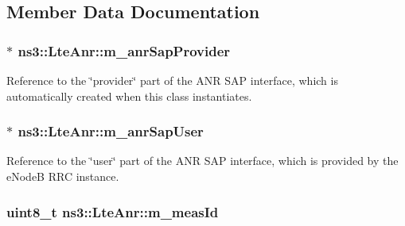 \subsection{Member Data Documentation}
\subsubsection[{\texorpdfstring{m\+\_\+anr\+Sap\+Provider}{m_anrSapProvider}}]{$\ast$ ns3\+::\+Lte\+Anr\+::m\+\_\+anr\+Sap\+Provider\hspace{0.3cm}{\ttfamily [private]}}\hypertarget{classns3_1_1LteAnr_a5355c7d93e18c6297707280bcabebe15}{}\label{classns3_1_1LteAnr_a5355c7d93e18c6297707280bcabebe15}


Reference to the \char`\"{}provider\char`\"{} part of the A\+NR S\+AP interface, which is automatically created when this class instantiates. 

\subsubsection[{\texorpdfstring{m\+\_\+anr\+Sap\+User}{m_anrSapUser}}]{$\ast$ ns3\+::\+Lte\+Anr\+::m\+\_\+anr\+Sap\+User\hspace{0.3cm}{\ttfamily [private]}}\hypertarget{classns3_1_1LteAnr_a5bad60480cc567b130599b0077854a5b}{}\label{classns3_1_1LteAnr_a5bad60480cc567b130599b0077854a5b}


Reference to the \char`\"{}user\char`\"{} part of the A\+NR S\+AP interface, which is provided by the e\+NodeB R\+RC instance. 

\subsubsection[{\texorpdfstring{m\+\_\+meas\+Id}{m_measId}}]{\setlength{\rightskip}{0pt plus 5cm}uint8\+\_\+t ns3\+::\+Lte\+Anr\+::m\+\_\+meas\+Id\hspace{0.3cm}{\ttfamily [private]}}\hypertarget{classns3_1_1LteAnr_a59e92d899d5e105c0dad69d79310a844}{}\label{classns3_1_1LteAnr_a59e92d899d5e105c0dad69d79310a844}

